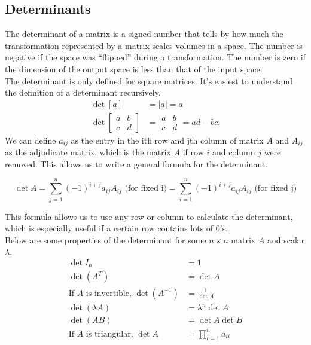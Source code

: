 \subsection{Determinants}
\noindent
The determinant of a matrix is a signed number that tells by how much the transformation represented by a matrix scales volumes in a space.
The number is negative if the space was ``flipped'' during a transformation.
The number is zero if the dimension of the output space is less than that of the input space.\\

\noindent
The determinant is only defined for square matrices. It's easiest to understand the definition of a determinant recursively.
\begin{align*}
	\det{\left[ a \right]} &= \lvert a \rvert = a \\
	\det{\left[
		\begin{array}{cc}
			a & b \\
			c & d
		\end{array}
		\right]} &= \begin{array}{|cc|}
		a & b \\
		c & d
	\end{array} = ad - bc.
\end{align*}
We can define $a_{ij}$ as the entry in the ith row and jth column of matrix $A$ and $A_{ij}$ as the adjudicate matrix, which is the matrix $A$ if row $i$ and column $j$ were removed. This allows us to write a general formula for the determinant.
\begin{definition}
	\begin{equation*}
		\det{A} = \sum_{j=1}^{n}{\left(-1\right)^{i+j}a_{ij}A_{ij}} \text{ (for fixed i)} = \sum_{i=1}^{n}{\left(-1\right)^{i+j}a_{ij}A_{ij}} \text{ (for fixed j)}
	\end{equation*}
\end{definition}
\noindent
This formula allows us to use any row or column to calculate the determinant, which is especially useful if a certain row contains lots of 0's.\\

\noindent
Below are some properties of the determinant for some $n \times n$ matrix $A$ and scalar $\lambda$.
\begin{align*}
	\det{I_n} &= 1 \\
	\det{(A^T)} &= \det{A} \\
	\text{If $A$ is invertible, } \det{(A^{-1})} &= \frac{1}{\det{A}} \\
	\det{(\lambda A)} &= \lambda^n\det{A} \\
	\det{(AB)} &= \det{A}\det{B} \\
	\text{If $A$ is triangular, } \det{A} &= \prod_{i=1}^{n}{a_{ii}}
\end{align*}

